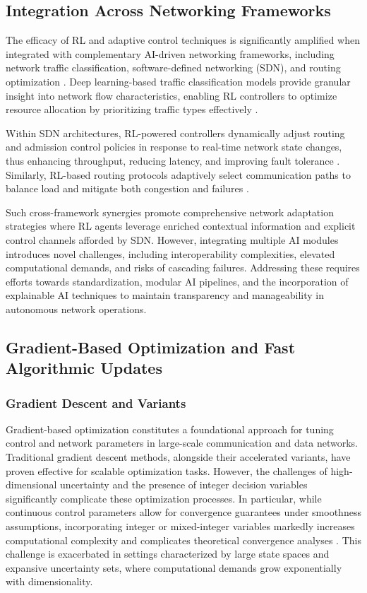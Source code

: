 \documentclass[sigconf]{acmart}
\begin{document}
\subsection{Integration Across Networking Frameworks}

The efficacy of RL and adaptive control techniques is significantly amplified when integrated with complementary AI-driven networking frameworks, including network traffic classification, software-defined networking (SDN), and routing optimization \cite{ref51,ref52,ref53}. Deep learning-based traffic classification models provide granular insight into network flow characteristics, enabling RL controllers to optimize resource allocation by prioritizing traffic types effectively \cite{ref51}.

Within SDN architectures, RL-powered controllers dynamically adjust routing and admission control policies in response to real-time network state changes, thus enhancing throughput, reducing latency, and improving fault tolerance \cite{ref52}. Similarly, RL-based routing protocols adaptively select communication paths to balance load and mitigate both congestion and failures \cite{ref53}.

Such cross-framework synergies promote comprehensive network adaptation strategies where RL agents leverage enriched contextual information and explicit control channels afforded by SDN. However, integrating multiple AI modules introduces novel challenges, including interoperability complexities, elevated computational demands, and risks of cascading failures. Addressing these requires efforts towards standardization, modular AI pipelines, and the incorporation of explainable AI techniques to maintain transparency and manageability in autonomous network operations.

\subsection{Gradient-Based Optimization and Fast Algorithmic Updates}

\subsubsection{Gradient Descent and Variants}

Gradient-based optimization constitutes a foundational approach for tuning control and network parameters in large-scale communication and data networks. Traditional gradient descent methods, alongside their accelerated variants, have proven effective for scalable optimization tasks. However, the challenges of high-dimensional uncertainty and the presence of integer decision variables significantly complicate these optimization processes. In particular, while continuous control parameters allow for convergence guarantees under smoothness assumptions, incorporating integer or mixed-integer variables markedly increases computational complexity and complicates theoretical convergence analyses \cite{ref36}. This challenge is exacerbated in settings characterized by large state spaces and expansive uncertainty sets, where computational demands grow exponentially with dimensionality.
\end{document}
